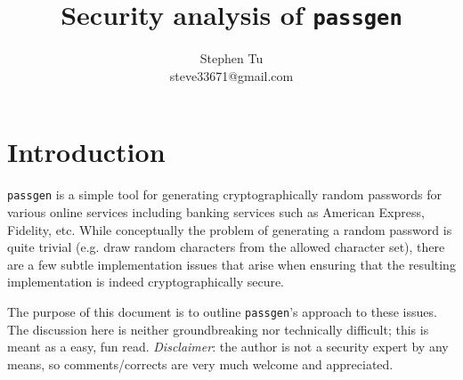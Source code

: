 \documentclass[10pt]{article}
\title{Security analysis of \texttt{passgen}}
\date{}
\author{Stephen Tu \\ steve33671@gmail.com}
\begin{document}
\maketitle

\section{Introduction}
\texttt{passgen} is a simple tool for generating cryptographically random
passwords for various online services including banking services such as
American Express, Fidelity, etc. While conceptually the problem of generating a
random password is quite trivial (e.g. draw random characters from the allowed
character set), there are a few subtle implementation issues that arise when
ensuring that the resulting implementation is indeed cryptographically secure.

The purpose of this document is to outline \texttt{passgen}'s approach to these
issues. The discussion here is neither groundbreaking nor technically
difficult; this is meant as a easy, fun read. \textit{Disclaimer}: the author is
not a security expert by any means, so comments/corrects are very much welcome
and appreciated.
\end{document}
